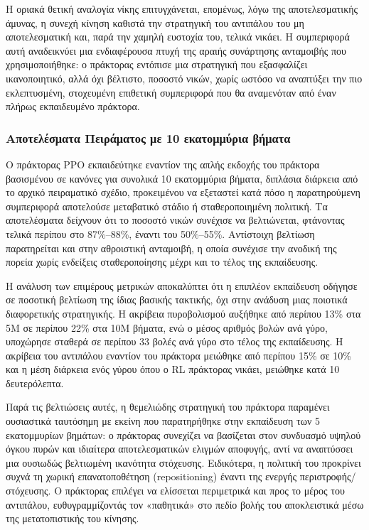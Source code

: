 \documentclass[12pt]{article}
\begin{document}
Η οριακά θετική αναλογία νίκης επιτυγχάνεται, επομένως, λόγω της αποτελεσματικής άμυνας, η συνεχή κίνηση καθιστά την στρατηγική του αντιπάλου του μη αποτελεσματική και, παρά την χαμηλή ευστοχία του, τελικά νικάει. Η συμπεριφορά αυτή αναδεικνύει μια ενδιαφέρουσα πτυχή της αραιής συνάρτησης ανταμοιβής που χρησιμοποιήθηκε: ο πράκτορας εντόπισε μια στρατηγική που εξασφαλίζει ικανοποιητικό, αλλά όχι βέλτιστο, ποσοστό νικών, χωρίς ωστόσο να αναπτύξει την πιο εκλεπτυσμένη, στοχευμένη επιθετική συμπεριφορά που θα αναμενόταν από έναν πλήρως εκπαιδευμένο πράκτορα.

\subsubsection{Αποτελέσματα Πειράματος με 10 εκατομμύρια βήματα}
Ο πράκτορας PPO εκπαιδεύτηκε εναντίον της απλής εκδοχής του πράκτορα βασισμένου σε κανόνες για συνολικά 10 εκατομμύρια βήματα, διπλάσια διάρκεια από το αρχικό πειραματικό σχέδιο, προκειμένου να εξεταστεί κατά πόσο η παρατηρούμενη συμπεριφορά αποτελούσε μεταβατικό στάδιο ή σταθεροποιημένη πολιτική. Τα αποτελέσματα δείχνουν ότι το ποσοστό νικών συνέχισε να βελτιώνεται, φτάνοντας τελικά περίπου στο 87\%–88\%, έναντι του 50\%–55\%. Αντίστοιχη βελτίωση παρατηρείται και στην αθροιστική ανταμοιβή, η οποία συνέχισε την ανοδική της πορεία χωρίς ενδείξεις σταθεροποίησης μέχρι και το τέλος της εκπαίδευσης.

Η ανάλυση των επιμέρους μετρικών αποκαλύπτει ότι η επιπλέον εκπαίδευση οδήγησε σε ποσοτική βελτίωση της ίδιας βασικής τακτικής, όχι στην ανάδυση μιας ποιοτικά διαφορετικής στρατηγικής. Η ακρίβεια πυροβολισμού αυξήθηκε από περίπου 13\% στα 5M σε περίπου 22\% στα 10M βήματα, ενώ ο μέσος αριθμός βολών ανά γύρο, υποχώρησε σταθερά σε περίπου 33 βολές ανά γύρο στο τέλος της εκπαίδευσης. Η ακρίβεια του αντιπάλου εναντίον του πράκτορα μειώθηκε από περίπου 15\% σε 10\% και η μέση διάρκεια ενός γύρου όπου ο RL πράκτορας νικάει, μειώθηκε κατά 10 δευτερόλεπτα.

Παρά τις βελτιώσεις αυτές, η θεμελιώδης στρατηγική του πράκτορα παραμένει ουσιαστικά ταυτόσημη με εκείνη που παρατηρήθηκε στην εκπαίδευση των 5 εκατομμυρίων βημάτων: ο πράκτορας συνεχίζει να βασίζεται στον συνδυασμό υψηλού όγκου πυρών και ιδιαίτερα αποτελεσματικών ελιγμών αποφυγής, αντί να αναπτύσσει μια ουσιωδώς βελτιωμένη ικανότητα στόχευσης. Ειδικότερα, η πολιτική του προκρίνει συχνά τη χωρική επανατοποθέτηση (repositioning) έναντι της ενεργής περιστροφής/στόχευσης. Ο πράκτορας επιλέγει να ελίσσεται περιμετρικά και προς το μέρος του αντιπάλου, ευθυγραμμίζοντάς τον «παθητικά» στο πεδίο βολής του αποκλειστικά μέσω της μετατοπιστικής του κίνησης.
\end{document}
